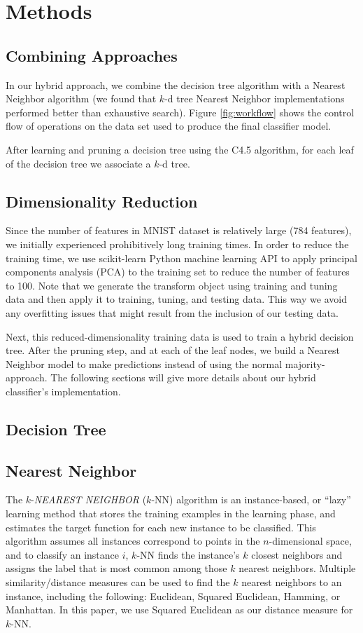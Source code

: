 \section{Methods}
\subsection{Combining Approaches}
In our hybrid approach, we combine the decision tree algorithm with a Nearest Neighbor algorithm (we found that $k$-d tree Nearest Neighbor implementations performed better than exhaustive search). Figure \ref{fig:workflow} shows the control flow of operations on the data set used to produce the final classifier model.

After learning and pruning a decision tree using the C4.5 algorithm, for each leaf of the decision tree we associate a $k$-d tree.

\subsection{Dimensionality Reduction}
Since the number of features in MNIST dataset is relatively large (784 features), we initially experienced prohibitively long training times. In order to reduce the training time, we use scikit-learn Python machine learning API to apply principal components analysis (PCA) to the training set to reduce the number of features to 100. Note that we generate the transform object using training and tuning data and then apply it to training, tuning, and testing data.  This way we avoid any overfitting issues that might result from the inclusion of our testing data.

Next, this reduced-dimensionality training data is used to train a hybrid decision tree. After the pruning step, and at each of the leaf nodes, we build a Nearest Neighbor model to make predictions instead of using the normal majority-approach. The following sections will give more details about our hybrid classifier's implementation.

\subsection{Decision Tree}

\subsection{Nearest Neighbor}
The $k$-\textit{NEAREST NEIGHBOR} ($k$-NN) algorithm is an instance-based, or ``lazy'' learning method that stores the training examples in the learning phase, and estimates the target function for each new instance to be classified. This algorithm assumes all instances correspond to points in the $n$-dimensional space, and to classify an instance $i$, $k$-NN finds the instance's $k$ closest neighbors and assigns the label that is most common among those $k$ nearest neighbors. Multiple similarity/distance measures can be used to find the $k$ nearest neighbors to an instance, including the following: Euclidean, Squared Euclidean, Hamming, or Manhattan. In this paper, we use Squared Euclidean as our distance measure for $k$-NN.


